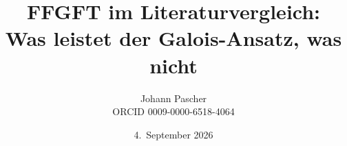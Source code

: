 \documentclass[11pt,a4paper]{report}
\title{FFGFT im Literaturvergleich:\\[0.5em]
  \large Was leistet der Galois-Ansatz, was nicht}
\date{4.~September 2026}
\author{Johann Pascher\\\small ORCID 0009-0000-6518-4064}
\begin{document}
\renewcommand{\thechapter}{}
\renewcommand{\thesection}{\arabic{section}}
\maketitle
\tableofcontents

\end{document}
